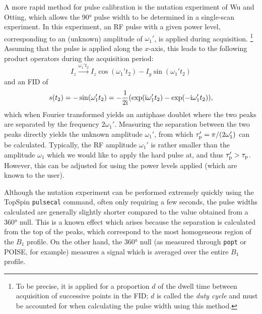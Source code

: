 A more rapid method for pulse calibration is the nutation experiment of Wu and Otting\autocite{Wu2005JMR}, which allows the \ang{90} pulse width to be determined in a single-scan experiment.
In this experiment, an RF pulse with a given power level, corresponding to an (unknown) amplitude of $\omega_1'$, is applied during acquisition.%
\footnote{To be precise, it is applied for a proportion $d$ of the dwell time between acquisition of successive points in the FID; $d$ is called the \textit{duty cycle} and must be accounted for when calculating the pulse width using this method.}
Assuming that the pulse is applied along the $x$-axis, this leads to the following product operators during the acquisition period:
\begin{equation}
    \label{eq:pulsecal_operators}
    I_z \xrightarrow{\omega_1' t_2} I_z \cos(\omega_1' t_2) - I_y \sin(\omega_1' t_2)
\end{equation}
and an FID of
\begin{equation}
    \label{eq:pulsecal_signal}
    s(t_2) = -\sin(\omega_1't_2) = -\frac{1}{2\mathrm{i}}(\exp(\mathrm{i} \omega_1' t_2) - \exp(-\mathrm{i} \omega_1' t_2)),
\end{equation}
which when Fourier transformed yields an antiphase doublet where the two peaks are separated by the frequency $2\omega_1'$.
Measuring the separation between the two peaks directly yields the unknown amplitude $\omega_1'$, from which $\tau_\mathrm{p}' = \pi/(2\omega_1')$ can be calculated.
Typically, the RF amplitude $\omega_1'$ is rather smaller than the amplitude $\omega_1$ which we would like to apply the hard pulse at, and thus $\tau_\mathrm{p}' > \tau_\mathrm{p}$.
However, this can be adjusted for using the power levels applied (which are known to the user).

Although the nutation experiment can be performed extremely quickly using the TopSpin \texttt{pulsecal} command, often only requiring a few seconds, the pulse widths calculated are generally slightly shorter compared to the value obtained from a \ang{360} null.
This is a known effect which arises because the separation is calculated from the top of the peaks, which correspond to the most homogeneous region of the $B_1$ profile.\autocite{Wu2005JMR}
On the other hand, the \ang{360} null (as measured through \texttt{popt} or POISE, for example) measures a signal which is averaged over the entire $B_1$ profile.

